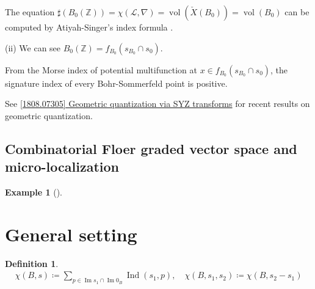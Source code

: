 \documentclass[a4paper,dvipdfmx,reqno,12pt]{amsart}
\theoremstyle{definition}
\newtheorem{Def}[Thm]{Definition}
\newtheorem{Eg}[Thm]{Example}
\newcommand{\deq}{\coloneqq}
\newcommand{\Z}{\mathbb{Z}}%
\newcommand{\mcal}[1]{\mathcal{#1}}%
\newcommand{\opn}[1]{\operatorname{#1}}
\numberwithin{equation}{section}
\begin{document}
The equation $\sharp (B_0(\Z))=\chi(\mcal{L},\nabla)=\opn{vol}(\check{X}(B_0))=\opn{vol}(B_0)$ can be computed by Atiyah-Singer's index formula \cite[Corollary 4.1]{MR1461965}.

(ii) We can see  $B_0(\Z)=f_{B_0}(s_{B_0} \cap s_0)$.

From the Morse index of potential multifunction at $x\in f_{B_0}(s_{B_0}\cap s_0)$, the signature index of every Bohr-Sommerfeld point is positive.

See
\href{https://arxiv.org/abs/1808.07305}{[1808.07305] Geometric quantization via SYZ transforms} for recent results on geometric quantization.



\subsection{Combinatorial Floer graded vector space and micro-localization}

\begin{Eg}[{\cite[p.22]{MR2031639}}]



\end{Eg}





\section{General setting}



\begin{Def}

  \begin{align}
    \chi(B,s)\deq \sum_{p\in \opn{Im} s_1 \cap \opn{Im} 0_B} \opn{Ind}(s_1,p), \quad   \chi(B,s_1,s_2)\deq \chi(B,s_2-s_1)
  \end{align}

\end{Def}
\end{document}
